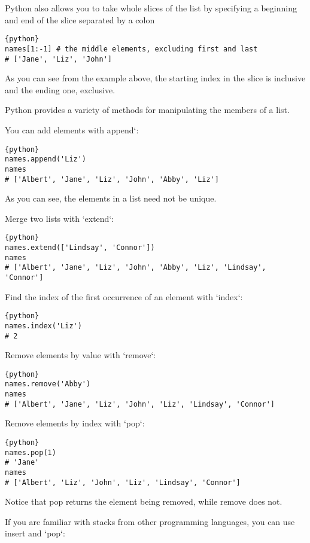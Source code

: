 Python also allows you to take whole slices of the list by specifying a
beginning and end of the slice separated by a colon


\begin{lstlisting}{python}
names[1:-1] # the middle elements, excluding first and last
# ['Jane', 'Liz', 'John']
\end{lstlisting}

As you can see from the example above, the starting index in the slice
is inclusive and the ending one, exclusive.

Python provides a variety of methods for manipulating the members of a
list.

You can add elements with append`:

\begin{lstlisting}{python}
names.append('Liz')
names
# ['Albert', 'Jane', 'Liz', 'John', 'Abby', 'Liz']
\end{lstlisting}

As you can see, the elements in a list need not be unique.

Merge two lists with `extend`:

\begin{lstlisting}{python}
names.extend(['Lindsay', 'Connor'])
names
# ['Albert', 'Jane', 'Liz', 'John', 'Abby', 'Liz', 'Lindsay', 'Connor']
\end{lstlisting}

Find the index of the first occurrence of an element with `index`:

\begin{lstlisting}{python}
names.index('Liz')
# 2
\end{lstlisting}

Remove elements by value with `remove`:

\begin{lstlisting}{python}
names.remove('Abby')
names
# ['Albert', 'Jane', 'Liz', 'John', 'Liz', 'Lindsay', 'Connor']
\end{lstlisting}

Remove elements by index with `pop`:

\begin{lstlisting}{python}
names.pop(1)
# 'Jane'
names
# ['Albert', 'Liz', 'John', 'Liz', 'Lindsay', 'Connor']
\end{lstlisting}

Notice that pop returns the element being removed, while remove does
not.

If you are familiar with stacks from other programming languages, you
can use insert and `pop`:

